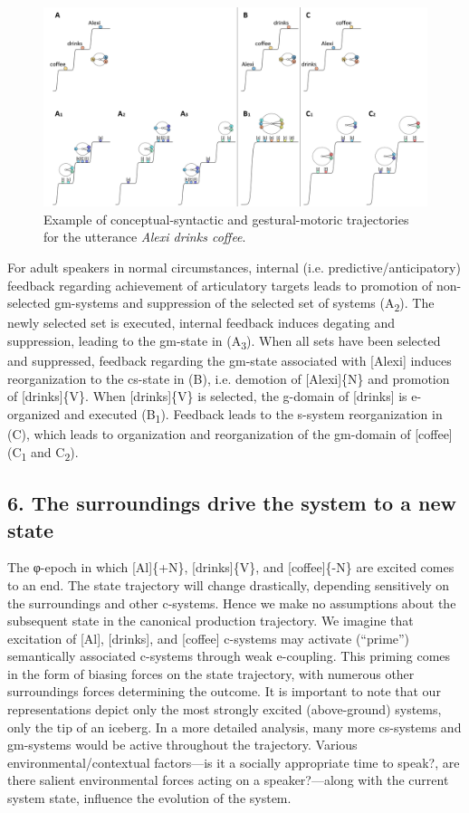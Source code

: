   
\begin{figure}
\includegraphics[width=\textwidth]{figures/Tilsen-img55.png}
\caption{Example of conceptual-syntactic and gestural-motoric trajectories for the utterance \textit{Alexi drinks coffee}.}
\label{fig:4:5}
\end{figure}
 

  For adult speakers in normal circumstances, internal (i.e. predictive/anticipatory) feedback regarding achievement of articulatory targets leads to promotion of non-selected gm-systems and suppression of the selected set of systems (A\textsubscript{2}). The newly selected set is executed, internal feedback induces degating and suppression, leading to the gm-state in (A\textsubscript{3}). When all sets have been selected and suppressed, feedback regarding the gm-state associated with [Alexi] induces reorganization to the cs-state in (B), i.e. demotion of [Alexi]\{N\} and promotion of [drinks]\{V\}. When [drinks]\{V\} is selected, the g-domain of [drinks] is e-organized and executed (B\textsubscript{1}). Feedback leads to the s-system reorganization in (C), which leads to organization and reorganization of the gm-domain of [coffee] (C\textsubscript{1} and C\textsubscript{2}).

\subsection{6. The surroundings drive the system to a new state}

The φ-epoch in which [Al]\{+N\}, [drinks]\{V\}, and [coffee]\{-N\} are excited comes to an end. The state trajectory will change drastically, depending sensitively on the surroundings and other c-systems. Hence we make no assumptions about the subsequent state in the canonical production trajectory. We imagine that excitation of [Al], [drinks], and [coffee] c-systems may activate (“prime”) semantically associated c-systems through weak e-coupling. This priming comes in the form of biasing forces on the state trajectory, with numerous other surroundings forces determining the outcome. It is important to note that our representations depict only the most strongly excited (above-ground) systems, only the tip of an iceberg. In a more detailed analysis, many more cs-systems and gm-systems would be active throughout the trajectory. Various environmental/contextual factors—is it a socially appropriate time to speak?, are there salient environmental forces acting on a speaker?—along with the current system state, influence the evolution of the system. 


